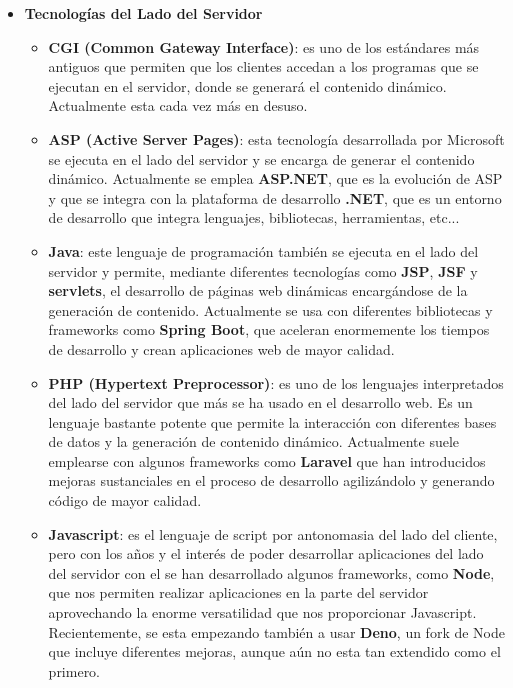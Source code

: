 \begin{itemize}
    \item \textbf{Tecnologías del Lado del Servidor}
    \begin{itemize}
        \item \textbf{CGI (Common Gateway Interface)}: es uno de los estándares más antiguos que permiten que los clientes accedan a los programas que se ejecutan en el servidor, donde se generará el contenido dinámico. Actualmente esta cada vez más en desuso.

        \item \textbf{ASP (Active Server Pages)}: esta tecnología desarrollada por Microsoft se ejecuta en el lado del servidor y se encarga de generar el contenido dinámico. Actualmente se emplea \textbf{ASP.NET}, que es la evolución de ASP y que se integra con la plataforma de desarrollo \textbf{.NET}, que es un entorno de desarrollo que integra lenguajes, bibliotecas, herramientas, etc...

        \item \textbf{Java}: este lenguaje de programación también se ejecuta en el lado del servidor y permite, mediante diferentes tecnologías como \textbf{JSP}, \textbf{JSF} y \textbf{servlets}, el desarrollo de páginas web dinámicas encargándose de la generación de contenido. Actualmente se usa con diferentes bibliotecas y frameworks como \textbf{Spring Boot}, que aceleran enormemente los tiempos de desarrollo y crean aplicaciones web de mayor calidad.

        \item \textbf{PHP (Hypertext Preprocessor)}: es uno de los lenguajes interpretados del lado del servidor que más se ha usado en el desarrollo web. Es un lenguaje bastante potente que permite la interacción con diferentes bases de datos y la generación de contenido dinámico. Actualmente suele emplearse con algunos frameworks como \textbf{Laravel} que han introducidos mejoras sustanciales en el proceso de desarrollo agilizándolo y generando código de mayor calidad.

        \item \textbf{Javascript}: es el lenguaje de script por antonomasia del lado del cliente, pero con los años y el interés de poder desarrollar aplicaciones del lado del servidor con el se han desarrollado algunos frameworks, como \textbf{Node}, que nos permiten realizar aplicaciones en la parte del servidor aprovechando la enorme versatilidad que nos proporcionar Javascript. Recientemente, se esta empezando también a usar \textbf{Deno}, un fork de Node que incluye diferentes mejoras, aunque aún no esta tan extendido como el primero.


\end{itemize}
\end{itemize}
